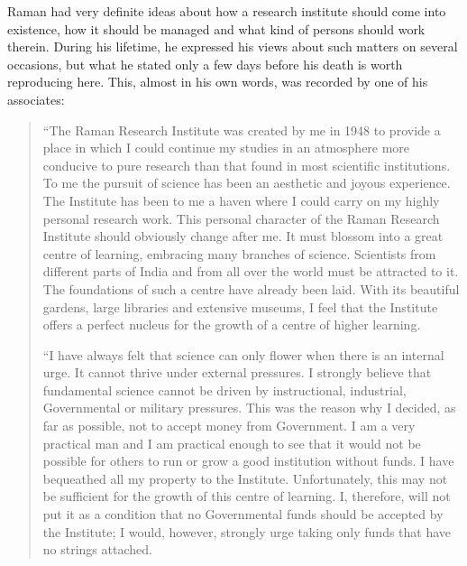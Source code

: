 Raman had very definite ideas about how a research institute
should come into existence, how it should be managed and what
kind of persons should work therein. During his lifetime, he
expressed his views about such matters on several occasions, but
what he stated only a few days before his death is worth
reproducing here. This, almost in his own words, was recorded
by one of his associates:
\begin{quote}
{\fontsize{10}{12}\selectfont
``The Raman Research Institute was created by me in 1948
to provide a place in which I could continue my studies in an
atmosphere more conducive to pure research than that found in
most scientific institutions. To me the pursuit of science has been
an aesthetic and joyous experience. The Institute has been to me
a haven where I could carry on my highly personal research work.
This personal character of the Raman Research Institute should
obviously change after me. It must blossom into a great centre
of learning, embracing many branches of science. Scientists from
different parts of India and from all over the world must be
attracted to it. The foundations of such a centre have already been
laid. With its beautiful gardens, large libraries and extensive
museums, I feel that the Institute offers a perfect nucleus for the
growth of a centre of higher learning.

``I have always felt that science can only flower when there
is an internal urge. It cannot thrive under external pressures.
I strongly believe that fundamental science cannot be driven by instructional, industrial, Governmental or military pressures. 
This was the reason why I decided, as far as possible, not to accept
money from Government. I am a very practical man and I am
practical enough to see that it would not be possible for others
to run or grow a good institution without funds. I have bequeathed
all my property to the Institute. Unfortunately, this may not be
sufficient for the growth of this centre of learning. I, therefore,
will not put it as a condition that no Governmental funds should
be accepted by the Institute; I would, however, strongly urge
taking only funds that have no strings attached.

\newpage

}
\end{quote}
